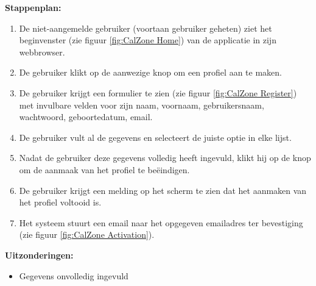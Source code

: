 \textbf{Stappenplan:}
\begin{enumerate}
\item De niet-aangemelde gebruiker (voortaan gebruiker geheten) ziet het beginvenster (zie figuur \ref{fig:CalZone Home}) van de applicatie in zijn webbrowser.
\item De gebruiker klikt op de aanwezige knop om een profiel aan te maken.
\item De gebruiker krijgt een formulier te zien (zie figuur \ref{fig:CalZone Register}) met invulbare velden voor zijn naam, voornaam, gebruikersnaam, wachtwoord, geboortedatum, email. 
\item De gebruiker vult al de gegevens en selecteert de juiste optie in elke lijst.
\item Nadat de gebruiker deze gegevens volledig heeft ingevuld, klikt hij op de knop om de aanmaak van het profiel te beëindigen.
\item De gebruiker krijgt een melding op het scherm te zien dat het aanmaken van het profiel voltooid is.
\item Het systeem stuurt een email naar het opgegeven emailadres ter bevestiging (zie figuur \ref{fig:CalZone Activation}).
\end{enumerate}

\textbf{Uitzonderingen:}
\begin{itemize}
\item Gegevens onvolledig ingevuld
\end{itemize}

